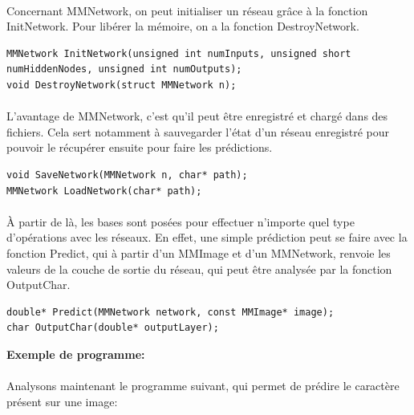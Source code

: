 \documentclass{article}
\begin{document}
\paragraph{}Concernant MMNetwork, on peut initialiser un réseau grâce à la fonction InitNetwork.
Pour libérer la mémoire, on a la fonction DestroyNetwork.

\begin{lstlisting}
MMNetwork InitNetwork(unsigned int numInputs, unsigned short numHiddenNodes, unsigned int numOutputs);
void DestroyNetwork(struct MMNetwork n);

\end{lstlisting}

\paragraph{}L'avantage de MMNetwork, c'est qu'il peut être enregistré et chargé dans des fichiers. Cela sert notamment à sauvegarder l'état d'un réseau enregistré pour pouvoir le récupérer ensuite pour faire les prédictions.

\begin{lstlisting}
void SaveNetwork(MMNetwork n, char* path);
MMNetwork LoadNetwork(char* path);
\end{lstlisting}


\paragraph{}
À partir de là, les bases sont posées pour effectuer n'importe quel type d'opérations avec les réseaux. En effet, une simple prédiction peut se faire avec la fonction Predict, qui à partir d'un MMImage et d'un MMNetwork, renvoie les valeurs de la couche de sortie du réseau, qui peut être analysée par la fonction OutputChar.

\begin{lstlisting}
double*	Predict(MMNetwork network, const MMImage* image);
char OutputChar(double* outputLayer);
\end{lstlisting}


\textbf{Exemple de programme:}

\paragraph{}Analysons maintenant le programme suivant, qui permet de prédire le caractère présent sur une image:
\end{document}
